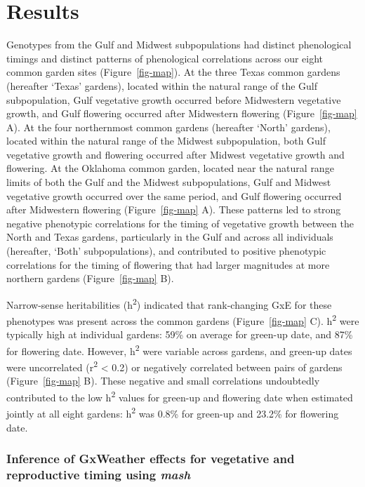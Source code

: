 \documentclass[
  9pt,
  twocolumn,
  twoside]{pnas-new}
\begin{document}
\section{Results}\label{results}

Genotypes from the Gulf and Midwest subpopulations had distinct
phenological timings and distinct patterns of phenological correlations
across our eight common garden sites (Figure~\ref{fig-map}). At the
three Texas common gardens (hereafter `Texas' gardens), located within
the natural range of the Gulf subpopulation, Gulf vegetative growth
occurred before Midwestern vegetative growth, and Gulf flowering
occurred after Midwestern flowering (Figure~\ref{fig-map} A). At the
four northernmost common gardens (hereafter `North' gardens), located
within the natural range of the Midwest subpopulation, both Gulf
vegetative growth and flowering occurred after Midwest vegetative growth
and flowering. At the Oklahoma common garden, located near the natural
range limits of both the Gulf and the Midwest subpopulations, Gulf and
Midwest vegetative growth occurred over the same period, and Gulf
flowering occurred after Midwestern flowering (Figure~\ref{fig-map} A).
These patterns led to strong negative phenotypic correlations for the
timing of vegetative growth between the North and Texas gardens,
particularly in the Gulf and across all individuals (hereafter, `Both'
subpopulations), and contributed to positive phenotypic correlations for
the timing of flowering that had larger magnitudes at more northern
gardens (Figure~\ref{fig-map} B).

Narrow-sense heritabilities (h\textsuperscript{2}) indicated that
rank-changing GxE for these phenotypes was present across the common
gardens (Figure~\ref{fig-map} C). h\textsuperscript{2} were typically
high at individual gardens: 59\% on average for green-up date, and 87\%
for flowering date. However, h\textsuperscript{2} were variable across
gardens, and green-up dates were uncorrelated (r\textsuperscript{2}
\textless{} 0.2) or negatively correlated between pairs of gardens
(Figure~\ref{fig-map} B). These negative and small correlations
undoubtedly contributed to the low h\textsuperscript{2} values for
green-up and flowering date when estimated jointly at all eight gardens:
h\textsuperscript{2} was 0.8\% for green-up and 23.2\% for flowering
date.

\subsubsection{\texorpdfstring{Inference of GxWeather effects for
vegetative and reproductive timing using
\emph{mash}}{Inference of GxWeather effects for vegetative and reproductive timing using mash}}\label{inference-of-gxweather-effects-for-vegetative-and-reproductive-timing-using-mash}
\end{document}
